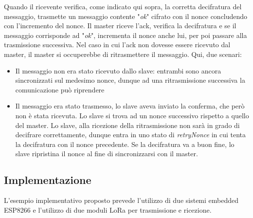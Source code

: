 \newline\newline
Quando il ricevente verifica, come indicato qui sopra, la corretta decifratura del messaggio, trasmette un messaggio contente "\textsl{ok}" cifrato con il nonce concludendo con l'incremento del nonce. 
\newline\newline
Il master riceve l'ack, verifica la decifratura e se il messaggio corrisponde ad "\textsl{ok}", incrementa il nonce anche lui, per poi passare alla trasmissione successiva. 
\newline\newline
Nel caso in cui l'ack non dovesse essere ricevuto dal master, il master si occuperebbe di ritrasmettere il messaggio. Qui, due scenari: 
\begin{itemize}
    \item Il messaggio non era stato ricevuto dallo slave: entrambi sono ancora sincronizzati sul medesimo nonce, dunque ad una ritrasmissione successiva la comunicazione può riprendere
    \item Il messaggio era stato trasmesso, lo slave aveva inviato la conferma, che però non è stata ricevuta. Lo slave si trova ad un nonce successivo rispetto a quello del master. Lo slave, alla ricezione della ritrasmissione non sarà in grado di decifrare correttamente, dunque entra in uno stato di \textsl{retryNonce} in cui tenta la decifratura con il nonce precedente. Se la decifratura va a buon fine, lo slave ripristina il nonce al fine di sincronizzarsi con il master.
\end{itemize}
\subsection{Implementazione}
L'esempio implementativo proposto prevede l'utilizzo di due sistemi embedded ESP8266 e l'utilizzo di due moduli LoRa per trasmissione e ricezione. 
\newpage